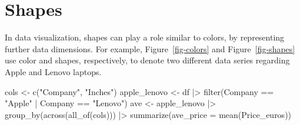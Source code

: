 \documentclass[
  letterpaper,
]{article}
\newenvironment{Shaded}{\begin{snugshade}}{\end{snugshade}}
\newcommand{\AttributeTok}[1]{\textcolor[rgb]{0.40,0.45,0.13}{#1}}
\newcommand{\FunctionTok}[1]{\textcolor[rgb]{0.28,0.35,0.67}{#1}}
\newcommand{\NormalTok}[1]{\textcolor[rgb]{0.00,0.23,0.31}{#1}}
\newcommand{\OtherTok}[1]{\textcolor[rgb]{0.00,0.23,0.31}{#1}}
\newcommand{\SpecialCharTok}[1]{\textcolor[rgb]{0.37,0.37,0.37}{#1}}
\newcommand{\StringTok}[1]{\textcolor[rgb]{0.13,0.47,0.30}{#1}}
\begin{document}
\begin{figure}[H]


\caption{\label{fig-boxplotbrewer}}

\end{figure}%

\section{Shapes}\label{shapes}

In data visualization, shapes can play a role similar to colors, by
representing further data dimensions. For example,
Figure~\ref{fig-colors} and Figure~\ref{fig-shapes} use color and
shapes, respectively, to denote two different data series regarding
Apple and Lenovo laptops.

\begin{Shaded}
\begin{Highlighting}[]
\NormalTok{cols }\OtherTok{\textless{}{-}} \FunctionTok{c}\NormalTok{(}\StringTok{"Company"}\NormalTok{, }\StringTok{"Inches"}\NormalTok{)}
\NormalTok{apple\_lenovo }\OtherTok{\textless{}{-}}\NormalTok{ df }\SpecialCharTok{|\textgreater{}} \FunctionTok{filter}\NormalTok{(Company }\SpecialCharTok{==} \StringTok{"Apple"} \SpecialCharTok{|}\NormalTok{ Company }\SpecialCharTok{==} \StringTok{"Lenovo"}\NormalTok{)}
\NormalTok{ave }\OtherTok{\textless{}{-}}\NormalTok{ apple\_lenovo }\SpecialCharTok{|\textgreater{}} \FunctionTok{group\_by}\NormalTok{(}\FunctionTok{across}\NormalTok{(}\FunctionTok{all\_of}\NormalTok{(cols))) }\SpecialCharTok{|\textgreater{}} \FunctionTok{summarize}\NormalTok{(}\AttributeTok{ave\_price =} \FunctionTok{mean}\NormalTok{(Price\_euros))}
\end{Highlighting}
\end{Shaded}
\end{document}
